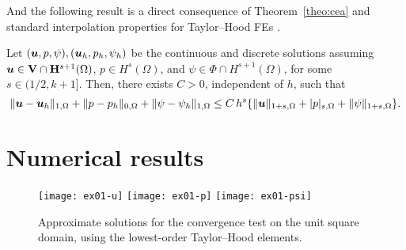 And the following result is a direct consequence of Theorem~\ref{theo:cea} and standard interpolation properties for Taylor--Hood FEs \cite{ern04}. 
\begin{theorem}\label{theo:conv}
Let $(\boldsymbol{u},p,\psi), (\boldsymbol{u}_h,p_h,\psi_h)$ be the continuous and discrete solutions assuming  $\boldsymbol{u} \in \mathbf{V}\cap \mathbf{H}^{s+1}(\Omega)$, $p\in H^s(\Omega)$, and $\psi \in \Phi \cap H^{s+1}(\Omega)$, for some $s\in (1/2,k+1]$. Then, there exists $C>0$, independent of $h$, such that 
\[ \|\boldsymbol{u} - \boldsymbol{u}_h\|_{1,\Omega} + \|p-p_h\|_{0,\Omega} + \|\psi - \psi_h\|_{1,\Omega} \leq C\,h^s \{ \|\boldsymbol{u}\|_{1+s,\Omega} +  |p|_{s,\Omega} +  \|\psi\|_{1+s,\Omega} \}. \]
\end{theorem}
\section{Numerical results}\label{sec:results}


\begin{figure}[t!]
\begin{center}
\texttt{[image: ex01-u]}
\texttt{[image: ex01-p]}
\texttt{[image: ex01-psi]}
\end{center}

\vspace{-0.4cm}
\caption{Approximate solutions 
for the convergence test on the unit square domain, using the lowest-order Taylor--Hood elements.}\label{fig1}
\end{figure}

